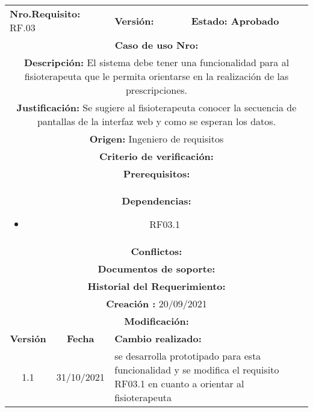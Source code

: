 \begin{center}
         \begin{tabular}{|c|c|p{4cm}|p{4cm}|}
            \hline
            \rowcolor{orange} \multicolumn{4}{|c|}{\textbf{Prioridad:} Media}  \\
            \hline
            \multicolumn{2}{|l}{\textbf{Nro.Requisito: }RF.03} & \multicolumn{1}{l|}{\textbf{Versión: }} & \multicolumn{1}{|l|}{\textbf{Estado: Aprobado}} \\
            \multicolumn{4}{|p{12cm}|}{\textbf{Caso de uso Nro: }}  \\
            \hline
            \multicolumn{4}{|p{13cm}|}{\textbf{Descripción: } El sistema debe tener una funcionalidad para al fisioterapeuta que le permita orientarse en la realización de las prescripciones.}  \\
            \multicolumn{4}{|p{13cm}|}{\textbf{Justificación: }Se sugiere al fisioterapeuta conocer la secuencia de pantallas de la interfaz web y como se esperan los datos.}  \\
            \multicolumn{4}{|p{12cm}|}{\textbf{Origen: }Ingeniero de requisitos}  \\
            \multicolumn{4}{|p{13cm}|}{\textbf{Criterio de verificación: }}  \\
            \hline
            \multicolumn{4}{|p{13cm}|}{\textbf{Prerequisitos: }}  \\
            \hline
            \multicolumn{4}{|p{12cm}|}{\textbf{Dependencias: }
                \begin{itemize}
                \item RF03.1
                \end{itemize}}  \\
            \multicolumn{4}{|p{12cm}|}{\textbf{Conflictos: }}  \\
            \hline
            \multicolumn{4}{|p{12cm}|}{\textbf{Documentos de soporte: }}  \\
            \hline
            \multicolumn{4}{|p{12cm}|}{\textbf{Historial del Requerimiento: }}  \\
            \multicolumn{4}{|p{12cm}|}{\textbf{Creación : }20/09/2021}  \\
            \multicolumn{4}{|p{12cm}|}{\textbf{Modificación: }}  \\
             \textbf{Versión} & \textbf{Fecha} & \multicolumn{2}{p{8cm}|}{\textbf{Cambio realizado:}} \\
            \hline
               1.1    &31/10/2021 &   \multicolumn{2}{p{8cm}|}{se desarrolla prototipado para esta funcionalidad y se modifica el requisito RF03.1 en cuanto a orientar al fisioterapeuta}
              \\
            \hline
        \end{tabular}
        

\end{center}
